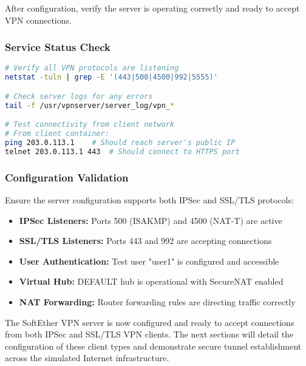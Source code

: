 After configuration, verify the server is operating correctly and ready to accept VPN connections.

\subsubsection{Service Status Check}

\begin{lstlisting}[language=bash]
# Verify all VPN protocols are listening
netstat -tuln | grep -E '(443|500|4500|992|5555)'

# Check server logs for any errors
tail -f /usr/vpnserver/server_log/vpn_*

# Test connectivity from client network
# From client container:
ping 203.0.113.1    # Should reach server's public IP
telnet 203.0.113.1 443  # Should connect to HTTPS port
\end{lstlisting}

\subsubsection{Configuration Validation}

Ensure the server configuration supports both IPSec and SSL/TLS protocols:

\begin{itemize}
    \item \textbf{IPSec Listeners:} Ports 500 (ISAKMP) and 4500 (NAT-T) are active
    \item \textbf{SSL/TLS Listeners:} Ports 443 and 992 are accepting connections
    \item \textbf{User Authentication:} Test user "user1" is configured and accessible
    \item \textbf{Virtual Hub:} DEFAULT hub is operational with SecureNAT enabled
    \item \textbf{NAT Forwarding:} Router forwarding rules are directing traffic correctly
\end{itemize}

The SoftEther VPN server is now configured and ready to accept connections from both IPSec and SSL/TLS VPN clients. The next sections will detail the configuration of these client types and demonstrate secure tunnel establishment across the simulated Internet infrastructure.
